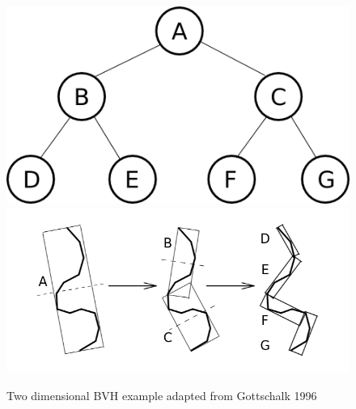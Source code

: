 \documentclass[12pt, a4paper]{article}
\begin{document}
\begin{figure}[H]
  \caption{Two dimensional BVH example adapted from Gottschalk 1996 \cite{Gottschalk_1996}}
  \label{2dbvh}
  \centering
  \includegraphics[scale=0.3]{binary_graph.png}
  \includegraphics[scale=0.3, trim = 0 50 0 0 ]{bvh_2d_ex.png}
\end{figure}

\end{document}
